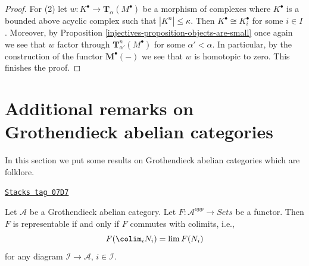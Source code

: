 \begin{proof}
\medskip\noindent
For (2) let $w : K^\bullet  \to \mathbf{T}_\alpha(M^\bullet)$
be a morphism of complexes where $K^\bullet$ is a bounded above acyclic
complex such that $|K^n| \leq \kappa$. Then $K^\bullet \cong K_i^\bullet$
for some $i \in I$. Moreover, by
Proposition \ref{injectives-proposition-objects-are-small}
once again we see that $w$ factor through
$\mathbf{T}^n_{\alpha'}(M^\bullet)$ for some $\alpha' < \alpha$.
In particular, by the construction of the functor
$\mathbf{M}^\bullet(-)$ we see that $w$ is homotopic to zero.
This finishes the proof.
\end{proof}

\section{Additional remarks on Grothendieck abelian categories}
\label{injectives-section-additional-Grothendieck}
In this section we put some results on Grothendieck abelian categories
which are folklore.

\begin{lemma}
\label{injectives-lemma-grothendieck-brown}
\href{https://stacks.math.columbia.edu/tag/07D7}{\texttt{Stacks tag 07D7}}

Let $\mathcal{A}$ be a Grothendieck abelian category.
Let $F : \mathcal{A}^{opp} \to \textit{Sets}$ be a functor.
Then $F$ is representable if and only if $F$ commutes with colimits, i.e.,
$$
F(\colim_i N_i) = \lim F(N_i)
$$
for any diagram $\mathcal{I} \to \mathcal{A}$, $i \in \mathcal{I}$.
\end{lemma}

